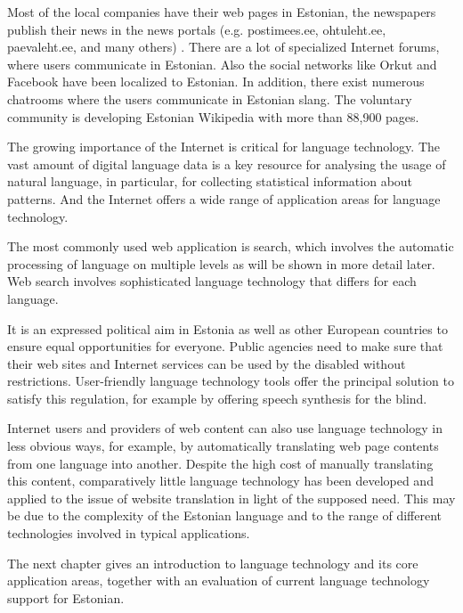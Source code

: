 \begin{multicols}{2}
Most of the local companies have their web pages in Estonian, the newspapers publish their news in the news portals (e.g. postimees.ee, ohtuleht.ee, paevaleht.ee, and many others) \cite{Neti}.
There are a lot of specialized Internet forums, where users communicate in Estonian. 
Also the social networks like Orkut and Facebook have been localized to Estonian. 
In addition, there exist numerous chatrooms where the users communicate in Estonian slang. 
The voluntary community is developing Estonian Wikipedia with more than 88,900 pages.

The growing importance of the Internet is critical for language technology. 
The vast amount of digital language data is a key resource for analysing the usage of natural language, in particular, for collecting statistical information about patterns. 
And the Internet offers a wide range of application areas for language technology. 

The most commonly used web application is search, which involves the automatic processing of language on multiple levels as will be shown in more detail later. 
Web search involves sophisticated language technology that differs for each language.

It is an expressed political aim in Estonia as well as other European countries to ensure equal opportunities for everyone.
Public agencies need to make sure that their web sites and Internet services can be used by the disabled without restrictions. 
User-friendly language technology tools offer the principal solution to satisfy this regulation, for example by offering speech synthesis for the blind.

Internet users and providers of web content can also use language technology in less obvious ways, for example, by automatically translating web page contents from one language into another. 
Despite the high cost of manually translating this content, comparatively little language technology has been developed and applied to the issue of website translation in light of the supposed need. 
This may be due to the complexity of the Estonian language and to the range of different technologies involved in typical applications. 

The next chapter gives an introduction to language technology and its core application areas, together with an evaluation of current language technology support for Estonian. 

\end{multicols}

\clearpage

